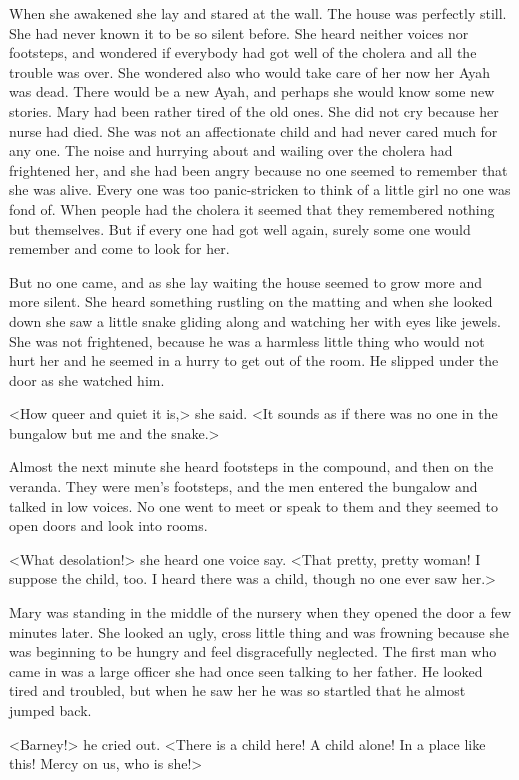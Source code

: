 When she awakened she lay and stared at the wall. The house was perfectly still. She had never known it to be so silent before. She heard neither voices nor footsteps, and wondered if everybody had got well of the cholera and all the trouble was over. She wondered also who would take care of her now her Ayah was dead. There would be a new Ayah, and perhaps she would know some new stories. Mary had been rather tired of the old ones. She did not cry because her nurse had died. She was not an affectionate child and had never cared much for any one. The noise and hurrying about and wailing over the cholera had frightened her, and she had been angry because no one seemed to remember that she was alive. Every one was too panic-stricken to think of a little girl no one was fond of. When people had the cholera it seemed that they remembered nothing but themselves. But if every one had got well again, surely some one would remember and come to look for her.

But no one came, and as she lay waiting the house seemed to grow more and more silent. She heard something rustling on the matting and when she looked down she saw a little snake gliding along and watching her with eyes like jewels. She was not frightened, because he was a harmless little thing who would not hurt her and he seemed in a hurry to get out of the room. He slipped under the door as she watched him.

<How queer and quiet it is,> she said. <It sounds as if there was no one in the bungalow but me and the snake.>

Almost the next minute she heard footsteps in the compound, and then on the veranda. They were men's footsteps, and the men entered the bungalow and talked in low voices. No one went to meet or speak to them and they seemed to open doors and look into rooms.

<What desolation!> she heard one voice say. <That pretty, pretty woman! I suppose the child, too. I heard there was a child, though no one ever saw her.>

Mary was standing in the middle of the nursery when they opened the door a few minutes later. She looked an ugly, cross little thing and was frowning because she was beginning to be hungry and feel disgracefully neglected. The first man who came in was a large officer she had once seen talking to her father. He looked tired and troubled, but when he saw her he was so startled that he almost jumped back.

<Barney!> he cried out. <There is a child here! A child alone! In a place like this! Mercy on us, who is she!>

